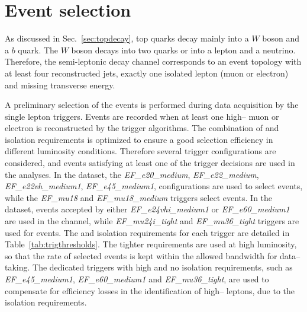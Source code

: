 \section{Event selection}
\label{sec:evtsel}

As discussed in Sec.~\ref{sec:topdecay}, top quarks
decay mainly into a $W$ boson and a $b$ quark. The $W$ boson decays
into two quarks or into a lepton and a neutrino. Therefore, the
semi-leptonic decay channel corresponds to an event topology with at
least four reconstructed jets, exactly one isolated lepton (muon or
electron) and missing transverse energy.

A preliminary selection of the events is performed during data
acquisition by the single lepton triggers. Events are recorded when at
least one high--\pt{} muon or electron is reconstructed by the trigger
algorithms. 
The combination of \pt{} and isolation requirements is optimized to ensure
a good selection efficiency in different luminosity
conditions.
Therefore several trigger configurations are
considered, and events satisfying at least one of the trigger
decisions are used in the analyses.
In the \seventev{} dataset, the {\it EF\_e20\_medium}, {\it
  EF\_e22\_medium}, {\it EF\_e22vh\_medium1}, {\it EF\_e45\_medium1},
configurations are used to select \ejets{} events, while the {\it
  EF\_mu18} and {\it EF\_mu18\_medium} triggers select \mujets{}
events. In the \eighttev{} dataset, events accepted by either {\it
  EF\_e24vhi\_medium1} or {\it EF\_e60\_medium1} are used in the
\ejets{} channel, while {\it EF\_mu24i\_tight} and {\it
  EF\_mu36\_tight} triggers are used for \mujets{} events.
The \pt{} and isolation requirements for each trigger are detailed in
Table~\ref{tab:trigthresholds}. 
The tighter requirements are used at high luminosity, so that
the rate of selected events is kept within the allowed bandwidth for
data--taking. The dedicated triggers with high \pt{} and no
isolation requirements, such as {\it EF\_e45\_medium1}, {\it
  EF\_e60\_medium1} and {\it EF\_mu36\_tight}, are used to compensate
for efficiency losses in the identification of high--\pt{} leptons,
due to the isolation requirements.
